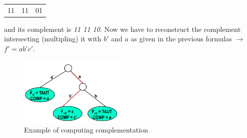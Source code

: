 \begin{center}
	\begin{tabular}{ c | c | c}
		11 & 11 & 01\\
	\end{tabular}
\end{center}

and its complement is \textit{11 11 10}. Now we have to reconstruct the complement intersecting (multipling) it with $b'$ and $a$ as given in the previous formulas $\rightarrow$ $f' = ab'c'$.

\begin{figure}[H]
	\centering
	\includegraphics[width=0.45\textwidth]{./Cap6/Images/Image16.png}
	\caption{Example of computing complementation}
	\label{fig:compcomplement}
\end{figure}